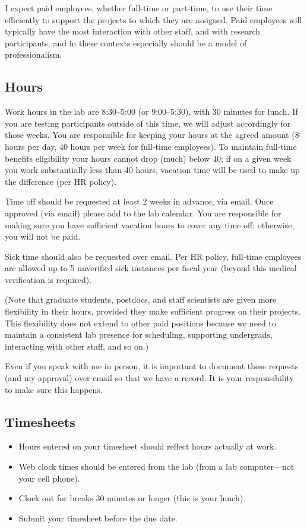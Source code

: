 \documentclass[letterpaper,12pt,oneside]{memoir}
\begin{document}
I expect paid employees, whether full-time or part-time, to use their time efficiently to support the projects to which they are assigned. Paid employees will typically have the most interaction with other staff, and with research participants, and in these contexts especially should be a model of professionalism.

\subsection{Hours}
Work hours in the lab are 8:30--5:00 (or 9:00--5:30), with 30 minutes for lunch. If you are testing participants outside of this time, we will adjust accordingly for those weeks. You are responsible for keeping your hours at the agreed amount (8 hours per day, 40 hours per week for full-time employees). To maintain full-time benefits eligibility your hours cannot drop (much) below 40; if on a given week you work substantially less than 40 hours, vacation time will be used to make up the difference (per HR policy).

Time off should be requested at least 2 weeks in advance, via email. Once approved (via email) please add to the lab calendar. You are responsible for making sure you have sufficient vacation hours to cover any time off; otherwise, you will not be paid.

Sick time should also be requested over email. Per HR policy, full-time employees are allowed up to 5 unverified sick instances per fiscal year (beyond this medical verification is required).

(Note that graduate students, postdocs, and staff scientists are given more flexibility in their hours, provided they make sufficient progress on their projects. This flexibility does not extend to other paid positions because we need to maintain a consistent lab presence for scheduling, supporting undergrads, interacting with other staff, and so on.)

\begin{shaded}
\noindent Even if you speak with me in person, it is important to document these requests (and my approval) over email so that we have a record. It is your responsibility to make sure this happens.
\end{shaded}

\subsection{Timesheets}

\begin{itemize}
\item Hours entered on your timesheet should reflect hours actually at work.
\item Web clock times should be entered from the lab (from a lab computer---not your cell phone).
\item Clock out for breaks 30 minutes or longer (this is your lunch).
\item Submit your timesheet before the due date.
\end{itemize}
\end{document}
